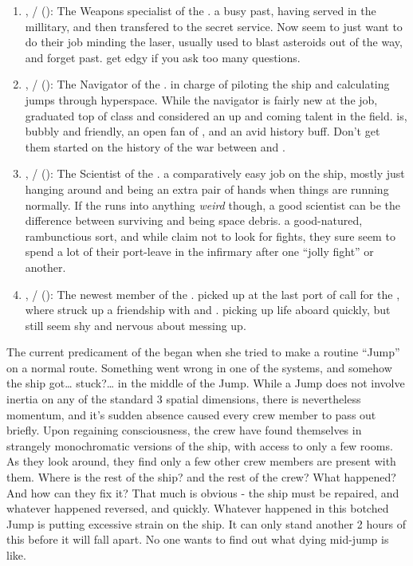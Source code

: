 \documentclass[blue]{TMFHope}
\begin{document}
\begin{enumerate}
  \item \cWeap{\full}, \cWeap{\they}/\cWeap{\them} (\cWeap{\MYplayer}): The Weapons specialist of the \pNew{}. \cWeap{\Theyhave} a busy past, having served in the millitary, and then transfered to the secret service. Now \cWeap{\they} seem\cWeap{\plural} to just want to do their job minding the \pNew{} laser, usually used to blast asteroids out of the way, and forget \cWeap{\their} past. \cWeap{} get\cWeap{\plural} edgy if you ask too many questions.
  
  \item \cNav{\full}, \cNav{\they}/\cNav{\them} (\cNav{\MYplayer}): The Navigator of the \pNew{}. \cNav{\Theyare} in charge of piloting the ship and calculating jumps through hyperspace. While the \pNew{} navigator is fairly new at the job, \cNav{\they} graduated top of \cNav{\their} class and  considered an up and coming talent in the field. \cNav{} is, bubbly and friendly, an open fan\cNav{\kid} of \cCap{}, and an avid history buff. Don't get them started on the history of the war between \pPlan{} and \pEdge{}.
  
  \item \cSci{\full}, \cSci{\they}/\cSci{\them} (\cSci{\MYplayer}): The Scientist of the \pNew{}. \cSci{\Theyhave} a comparatively easy job on the ship, mostly just hanging around and being an extra pair of hands when things are running normally. If the \pNew{} runs into anything \emph{weird} though, a good scientist can be the difference between surviving and being space debris. \cSci{\Theyare} a good-natured, rambunctious sort, and while \cSci{\they} claim not to look for fights, they sure seem to spend a lot of their port-leave in the infirmary after one ``jolly fight'' or another.
  
  \item \cBoy{\full}, \cBoy{\they}/\cBoy{\them} (\cBoy{\MYplayer}): The newest member of the \pNew{}. \cBoy{\Theywere} picked up at the last port of call for the \pNew{}, where \cBoy{\they} struck up a friendship with \cEng{} and \cNav{}. \cBoy{\Theyare} picking up life aboard \pNew{} quickly, but still seem shy and nervous about messing up.
\end{enumerate}

The current predicament of the \pNew{} began when she tried to make a routine ``Jump'' on a normal route. Something went wrong in one of the systems, and somehow the ship got\ldots{} stuck?\ldots{} in the middle of the Jump. While a Jump does not involve inertia on any of the standard 3 spatial dimensions, there is nevertheless momentum, and it's sudden absence caused every crew member to pass out briefly. Upon regaining consciousness, the crew have found themselves in strangely monochromatic versions of the ship, with access to only a few rooms. As they look around, they find only a few other crew members are present with them. Where is the rest of the ship? and the rest of the crew? What happened? And how can they fix it? That much is obvious - the ship must be repaired, and whatever happened reversed, and quickly. Whatever happened in this botched Jump is putting excessive strain on the ship. It can only stand another 2 hours of this before it will fall apart. No one wants to find out what dying mid-jump is like.
\end{document}
